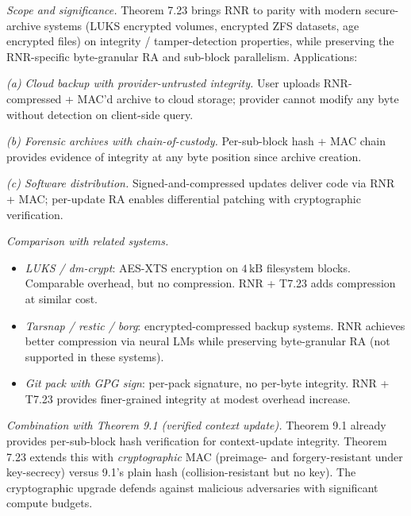 \documentclass[
]{article}
\begin{document}
\emph{Scope and significance.} Theorem 7.23 brings RNR to parity with
modern secure-archive systems (LUKS encrypted volumes, encrypted ZFS
datasets, age encrypted files) on integrity / tamper-detection
properties, while preserving the RNR-specific byte-granular RA and
sub-block parallelism. Applications:

\emph{(a) Cloud backup with provider-untrusted integrity.} User uploads
RNR-compressed + MAC'd archive to cloud storage; provider cannot
modify any byte without detection on client-side query.

\emph{(b) Forensic archives with chain-of-custody.} Per-sub-block
hash + MAC chain provides evidence of integrity at any byte position
since archive creation.

\emph{(c) Software distribution.} Signed-and-compressed updates
deliver code via RNR + MAC; per-update RA enables differential
patching with cryptographic verification.

\emph{Comparison with related systems.}
\begin{itemize}
\item \emph{LUKS / dm-crypt}: AES-XTS encryption on $4\,\mathrm{kB}$
filesystem blocks. Comparable overhead, but no compression. RNR +
T7.23 adds compression at similar cost.
\item \emph{Tarsnap / restic / borg}: encrypted-compressed backup
systems. RNR achieves better compression via neural LMs while
preserving byte-granular RA (not supported in these systems).
\item \emph{Git pack with GPG sign}: per-pack signature, no per-byte
integrity. RNR + T7.23 provides finer-grained integrity at modest
overhead increase.
\end{itemize}

\emph{Combination with Theorem 9.1 (verified context update).}
Theorem 9.1 already provides per-sub-block hash verification for
context-update integrity. Theorem 7.23 extends this with
\emph{cryptographic} MAC (preimage- and forgery-resistant under
key-secrecy) versus 9.1's plain hash (collision-resistant but no key).
The cryptographic upgrade defends against malicious adversaries with
significant compute budgets.
\end{document}
